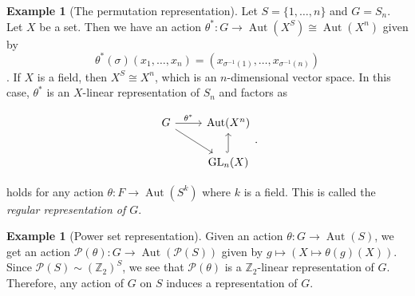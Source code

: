 \documentclass[10pt,letterpaper,cm]{nupset}
\theoremstyle{definition}
\newtheorem{exmp}[definition]{Example}
\theoremstyle{theorem}
\theoremstyle{remark}
\renewcommand{\P}{\mathcal P}
\newcommand{\Z}{\mathbb Z}
\newcommand{\1}{\mathbf{1}}
\newcommand{\0}{\vec 0}
\DeclareMathOperator*{\GL}{GL}
\DeclareMathOperator{\aut}{Aut}
\begin{document}
\medskip

\begin{exmp}[The permutation representation]\label{PR}
Let $S = \{1, \ldots, n\}$ and $G = S_n$. Let $X$ be a set. Then we have an action $\theta^{\ast} : G\to \aut(X^S) \cong \aut(X^n)$ given by $$\theta^{\ast}(\sigma)(x_1, \ldots, x_n) = \left(x_{\sigma^{-1}(1)}, \ldots, x_{\sigma^{-1}(n)}\right)$$. If $X$ is a field, then $X^S \cong X^n$, which is an $n$-dimensional vector space. In this case, $\theta^\ast$ is an $X$-linear representation of $S_n$ and factors as

\[ \begin{tikzcd}
G \arrow{r}{\theta^{\ast}} \arrow[swap]{dr} & \aut(X^n) \\%
 & \GL_n(X) \arrow[hookrightarrow]{u}
\end{tikzcd}.
\]

\end{exmp}

\smallskip

 holds for any action $\theta: F \to \aut(S^k)$ where $k$ is a field. This is called the \textit{regular representation of $G$}.


\medskip

\begin{exmp}[Power set representation]
Given an action $\theta: G \to \aut(S)$, we get an action $\P(\theta): G \to \aut(\P(S))$ given by $g \mapsto \left(X \mapsto \theta(g)(X)\right)$. Since $\P(S) \sim (\Z_2)^S$, we see that $\P(\theta)$  is a $\Z_2$-linear representation of $G$. Therefore, any action of $G$ on $S$ induces a representation of $G$.
\end{exmp}

\medskip
\end{document}
